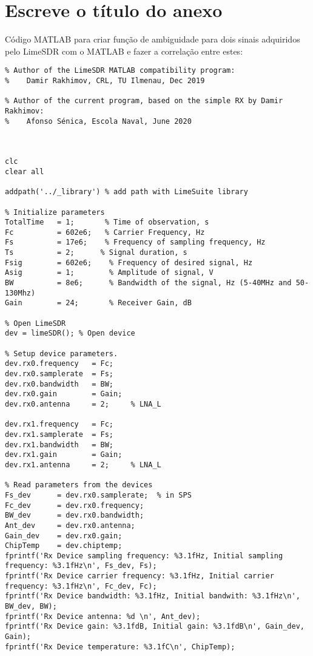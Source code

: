 
\chapter{Escreve o título do anexo} %

\label{Annex3} %

Código MATLAB para criar função de ambiguidade para dois sinais adquiridos pelo LimeSDR com o MATLAB e fazer a correlação entre estes:

\begin{verbatim}
% Author of the LimeSDR MATLAB compatibility program:
%    Damir Rakhimov, CRL, TU Ilmenau, Dec 2019

% Author of the current program, based on the simple RX by Damir Rakhimov:
%    Afonso Sénica, Escola Naval, June 2020



clc
clear all

addpath('../_library') % add path with LimeSuite library

% Initialize parameters
TotalTime   = 1;       % Time of observation, s
Fc          = 602e6;   % Carrier Frequency, Hz
Fs          = 17e6;    % Frequency of sampling frequency, Hz
Ts          = 2;      % Signal duration, s
Fsig        = 602e6;    % Frequency of desired signal, Hz
Asig        = 1;        % Amplitude of signal, V
BW          = 8e6;      % Bandwidth of the signal, Hz (5-40MHz and 50-130Mhz)
Gain        = 24;       % Receiver Gain, dB

% Open LimeSDR
dev = limeSDR(); % Open device

% Setup device parameters. 
dev.rx0.frequency   = Fc;
dev.rx0.samplerate  = Fs;
dev.rx0.bandwidth   = BW;
dev.rx0.gain        = Gain;
dev.rx0.antenna     = 2;     % LNA_L

dev.rx1.frequency   = Fc;
dev.rx1.samplerate  = Fs;
dev.rx1.bandwidth   = BW;
dev.rx1.gain        = Gain;
dev.rx1.antenna     = 2;     % LNA_L

% Read parameters from the devices
Fs_dev      = dev.rx0.samplerate;  % in SPS
Fc_dev      = dev.rx0.frequency;
BW_dev      = dev.rx0.bandwidth;
Ant_dev     = dev.rx0.antenna;
Gain_dev    = dev.rx0.gain;
ChipTemp    = dev.chiptemp;
fprintf('Rx Device sampling frequency: %3.1fHz, Initial sampling frequency: %3.1fHz\n', Fs_dev, Fs);
fprintf('Rx Device carrier frequency: %3.1fHz, Initial carrier frequency: %3.1fHz\n', Fc_dev, Fc);
fprintf('Rx Device bandwidth: %3.1fHz, Initial bandwith: %3.1fHz\n', BW_dev, BW);
fprintf('Rx Device antenna: %d \n', Ant_dev);
fprintf('Rx Device gain: %3.1fdB, Initial gain: %3.1fdB\n', Gain_dev, Gain);
fprintf('Rx Device temperature: %3.1fC\n', ChipTemp);


\end{verbatim}
